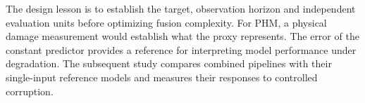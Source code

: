 The design lesson is to establish the target, observation horizon and independent evaluation units before optimizing fusion complexity. For PHM, a physical damage measurement would establish what the proxy represents. The error of the constant predictor provides a reference for interpreting model performance under degradation. The subsequent study compares combined pipelines with their single-input reference models and measures their responses to controlled corruption.
